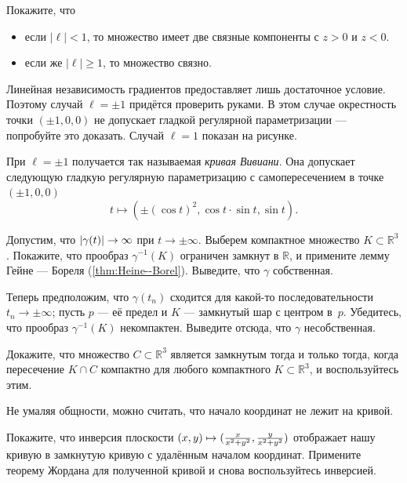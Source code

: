 \begin{multicols}{2}
Покажите, что 
\begin{itemize}
\item если $|\ell|<1$, то множество имеет две связные компоненты с $z>0$ и $z<0$.
\item если же $|\ell|\ge1$, то множество связно.
\end{itemize}

Линейная независимость градиентов предоставляет лишь достаточное условие.
Поэтому случай $\ell=\pm1$ придётся проверить руками.
В этом случае окрестность точки $(\pm1,0,0)$ не допускает гладкой регулярной параметризации --- попробуйте это доказать.
Случай $\ell=1$ показан на рисунке.



При $\ell=\pm1$ получается так называемая \emph{кривая Вивиани}.
Она допускает следующую гладкую регулярную параметризацию с самопересечением в точке $(\pm1,0,0)$
\[t\mapsto(\pm(\cos t)^2,\cos t\cdot\sin t,\sin t).\]

Допустим, что $|\gamma(t)|\z\to\infty$ при $t\to\pm\infty$.
Выберем компактное множество $K\subset \mathbb{R}^3$.
Покажите, что прообраз $\gamma^{-1}(K)$ ограничен замкнут в $\mathbb{R}$,
и примените лемму Гейне --- Бореля (\ref{thm:Heine--Borel}).
Выведите, что $\gamma$ собственная.

Теперь предположим, что $\gamma(t_n)$ сходится для какой-то последовательности $t_n\to \pm \infty$; пусть $p$ --- её предел и $K$ --- замкнутый шар с центром в~$p$.
Убедитесь, что прообраз $\gamma^{-1}(K)$ некомпактен.
Выведите отсюда, что $\gamma$ несобственная.

Докажите, что множество $C\subset \mathbb{R}^3$ является замкнутым тогда и только тогда, когда пересечение $K\cap C$ компактно для любого компактного $K\subset \mathbb{R}^3$,
и воспользуйтесь этим.

Не умаляя общности, можно считать, что начало координат не лежит на кривой.

Покажите, что инверсия плоскости $(x,y)\z\mapsto (\tfrac{x}{x^2+y^2},\tfrac{y}{x^2+y^2})$ отображает нашу кривую в замкнутую кривую с удалённым началом координат.
Примените теорему Жордана для полученной кривой и снова воспользуйтесь инверсией.




\end{multicols}
